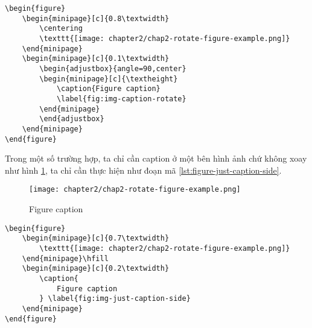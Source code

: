 \begin{lstlisting}[language={[LaTeX]TeX}, caption={Chèn hình ảnh với caption xoay $90^{\circ}$}, label={lst:figure-with-caption-rotate}]
\begin{figure}
    \begin{minipage}[c]{0.8\textwidth}
        \centering
        \texttt{[image: chapter2/chap2-rotate-figure-example.png]} 
    \end{minipage}
    \begin{minipage}[c]{0.1\textwidth}
        \begin{adjustbox}{angle=90,center}
        \begin{minipage}[c]{\textheight}
            \caption{Figure caption}
            \label{fig:img-caption-rotate}
        \end{minipage}
        \end{adjustbox}
    \end{minipage}
\end{figure}
\end{lstlisting}

Trong một số trường hợp, ta chỉ cần caption ở một bên hình ảnh chứ không xoay như hình \ref{fig:img-just-caption-side}, ta chỉ cần thực hiện như đoạn mã \ref{lst:figure-just-caption-side}.

\begin{figure}
    \begin{minipage}[c]{0.7\textwidth}
      \texttt{[image: chapter2/chap2-rotate-figure-example.png]}
    \end{minipage}\hfill
    \begin{minipage}[c]{0.2\textwidth}
      \caption{
        Figure caption
      } \label{fig:img-just-caption-side}
    \end{minipage}
\end{figure}

\begin{lstlisting}[language={[LaTeX]TeX}, caption={Chèn hình ảnh với caption ở bên phải $90^{\circ}$}, label={lst:figure-just-caption-side}]
\begin{figure}
    \begin{minipage}[c]{0.7\textwidth}
        \texttt{[image: chapter2/chap2-rotate-figure-example.png]}
    \end{minipage}\hfill
    \begin{minipage}[c]{0.2\textwidth}
        \caption{
            Figure caption
        } \label{fig:img-just-caption-side}
    \end{minipage}
\end{figure}
\end{lstlisting}